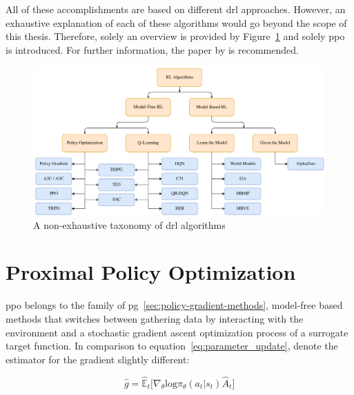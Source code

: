 \documentclass[draft,final]{vutinfth} %
\begin{document}
    All of these accomplishments are based on different \gls{drl} approaches.
    However, an exhaustive explanation of each of these algorithms would go beyond the scope of this thesis.
    Therefore, solely an overview is provided by Figure~\ref{fig:drl_taxonomy} and solely \gls{ppo} is introduced.
    For further information, the paper by \citeauthor{francois-lavet_introduction_2018} is recommended.

    \begin{figure}[h]
        \centering
        \includegraphics[width=\textwidth]{figures/drl_taxonomy.png}
        \caption[A non-exhaustive taxonomy of \acrlong{drl} algorithms]{A non-exhaustive taxonomy of \gls{drl} algorithms\protect\footnotemark}
        \label{fig:drl_taxonomy}
    \end{figure}



    \section{Proximal Policy Optimization}\label{sec:proximal-policy-optimization}
    \gls{ppo} belongs to the family of \gls{pg}~\eqref{sec:policy-gradient-methods}, model-free based methods that switches between gathering data by interacting with the environment and a stochastic gradient ascent optimization process of a surrogate target function.
    In comparison to equation~\ref{eq:parameter_update}, \citet{schulman_proximal_2017} denote the estimator for the gradient slightly different:

    \begin{equation}
        \hat{g}=\hat{\mathbb{E}}_t \bigg [\nabla_\theta \text{log}\pi_\theta(a_t|s_t)\hat{A}_t\bigg]\label{eq:policy_gradient_method_maximization}
    \end{equation}
\end{document}

